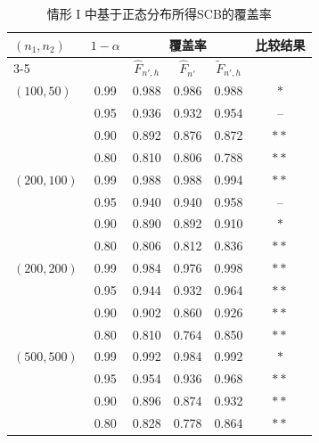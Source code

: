 \documentclass[a4paper,openay,14pt]{ctexbook}
\numberwithin{equation}{section}
\numberwithin{lem}{section}
\begin{document}
\begin{table}[tph]
\caption{情形 I 中基于正态分布所得SCB的覆盖率
}
\label{TAB:coveragerate-N(0,1)}
\centering
\begin{tabular}{lccccc}
\toprule
\multirow{2}{*}{$(n_1,n_2)$} & \multirow{2}{*}{$1-\alpha$} & \multicolumn{3}{c}{覆盖率} & \multirow{2}{*}{比较结果} \\ 
\cmidrule{3-5}
& & $\hat{F}_{n', h}$ & $\hat{F}_{n'}$ & $\tilde{F}_{n', h}$ & \\ 
\midrule
$(100,50)$  & 0.99 & 0.988 & 0.986 & 0.988 & $\ast$ \\
            & 0.95 & 0.936 & 0.932 & 0.954 & -- \\
            & 0.90 & 0.892 & 0.876 & 0.872 & $\ast\ast$ \\
            & 0.80 & 0.810 & 0.806 & 0.788 & $\ast\ast$ \\ \addlinespace
$(200,100)$ & 0.99 & 0.988 & 0.988 & 0.994 & $\ast\ast$ \\
            & 0.95 & 0.940 & 0.940 & 0.958 & -- \\
            & 0.90 & 0.890 & 0.892 & 0.910 & $\ast$ \\
            & 0.80 & 0.806 & 0.812 & 0.836 & $\ast\ast$ \\ \addlinespace
$(200,200)$ & 0.99 & 0.984 & 0.976 & 0.998 & $\ast\ast$ \\
            & 0.95 & 0.944 & 0.932 & 0.964 & $\ast\ast$ \\
            & 0.90 & 0.902 & 0.860 & 0.926 & $\ast\ast$ \\
            & 0.80 & 0.810 & 0.764 & 0.850 & $\ast\ast$ \\ \addlinespace
$(500,500)$ & 0.99 & 0.992 & 0.984 & 0.992 & $\ast$ \\
            & 0.95 & 0.954 & 0.936 & 0.968 & $\ast\ast$\\
            & 0.90 & 0.896 & 0.874 & 0.932 & $\ast\ast$ \\
            & 0.80 & 0.828 & 0.778 & 0.864 & $\ast\ast$\\ 
\bottomrule
\end{tabular}
\end{table}
\end{document}
